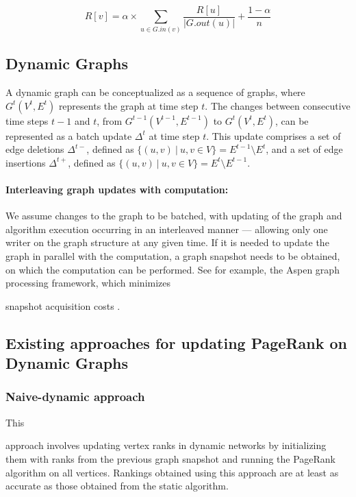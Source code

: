 \begin{equation}
\label{eq:pr}
    R[v] = \alpha \times \sum_{u \in G.in(v)} \frac{R[u]}{|G.out(u)|} + \frac{1 - \alpha}{n}
\end{equation}




\subsection{Dynamic Graphs}
\label{sec:about-dynamic}

A dynamic graph can be conceptualized as a sequence of graphs, where $G^t(V^t, E^t)$ represents the graph at time step $t$. The changes between consecutive time steps $t-1$ and $t$, from $G^{t-1}(V^{t-1}, E^{t-1})$ to $G^t(V^t, E^t)$, can be represented as a batch update $\Delta^t$ at time step $t$. This update comprises a set of edge deletions $\Delta^{t-}$, defined as $\{(u, v)\ |\ u, v \in V\} = E^{t-1} \setminus E^t$, and a set of edge insertions $\Delta^{t+}$, defined as $\{(u, v)\ |\ u, v \in V\} = E^t \setminus E^{t-1}$.


\paragraph{Interleaving graph updates with computation:}

We assume changes to the graph to be batched, with updating of the graph and algorithm execution occurring in an interleaved manner --- allowing only one writer on the graph structure at any given time. If it is needed to update the graph in parallel with the computation, a graph snapshot needs to be obtained, on which the computation can be performed. See for example, the Aspen graph processing framework, which minimizes snapshot acquisition costs \cite{graph-dhulipala19}.




\subsection{Existing approaches for updating PageRank on Dynamic Graphs}

\subsubsection{Naive-dynamic approach}
\label{sec:about-naive}

This approach involves updating vertex ranks in dynamic networks by initializing them with ranks from the previous graph snapshot and running the PageRank algorithm on all vertices. Rankings obtained using this approach are at least as accurate as those obtained from the static algorithm.



